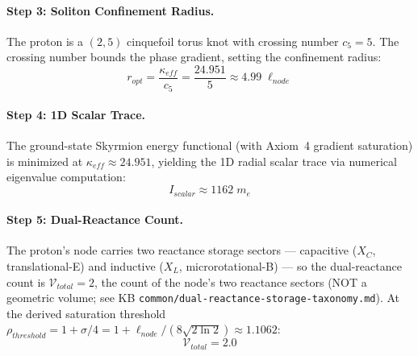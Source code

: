 \paragraph{Step 3: Soliton Confinement Radius.}
The proton is a $(2,5)$ cinquefoil torus knot with crossing number $c_5 = 5$.
The crossing number bounds the phase gradient, setting the confinement radius:
\begin{equation}
    r_{opt} = \frac{\kappa_{eff}}{c_5}
    = \frac{24.951}{5}
    \approx 4.99\;\ell_{node}
    \label{eq:r_opt}
\end{equation}

\paragraph{Step 4: 1D Scalar Trace.}
The ground-state Skyrmion energy functional (with Axiom~4 gradient saturation)
is minimized at $\kappa_{eff} \approx 24.951$, yielding the 1D radial scalar
trace via numerical eigenvalue computation:
\begin{equation}
    I_{scalar} \approx 1162\;m_e
    \label{eq:I_scalar}
\end{equation}

\paragraph{Step 5: Dual-Reactance Count.}
The proton's node carries two reactance storage sectors --- capacitive ($X_C$,
translational-E) and inductive ($X_L$, microrotational-B) --- so the
dual-reactance count is $\mathcal{V}_{total} = 2$, the count of the node's two
reactance sectors (NOT a geometric volume; see KB
\texttt{common/dual-reactance-storage-taxonomy.md}). At the derived saturation threshold
$\rho_{threshold} = 1 + \sigma/4 = 1 + \ell_{node}/(8\sqrt{2\ln 2})
\approx 1.1062$:
\begin{equation}
    \mathcal{V}_{total} = 2.0
    \label{eq:V_halo}
\end{equation}

